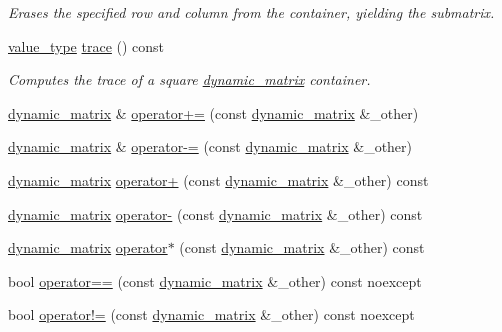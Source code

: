 \begin{DoxyCompactItemize}
$$\begin{DoxyCompactList}\small\item\em Erases the specified row and column from the container, yielding the submatrix. \end{DoxyCompactList}\item 
\hyperlink{classcrsc_1_1dynamic__matrix_a27b83d28002e3e2bb316f1f0460e9cca}{value\+\_\+type} \hyperlink{classcrsc_1_1dynamic__matrix_a78f379e2ac0864c82bca8c6d3153562f}{trace} () const 
\begin{DoxyCompactList}\small\item\em Computes the trace of a square {\ttfamily \hyperlink{classcrsc_1_1dynamic__matrix}{dynamic\+\_\+matrix}} container. \end{DoxyCompactList}\item 
\hyperlink{classcrsc_1_1dynamic__matrix}{dynamic\+\_\+matrix} \& \hyperlink{classcrsc_1_1dynamic__matrix_ad90a1ed68f4925e6362470e7231068ef}{operator+=} (const \hyperlink{classcrsc_1_1dynamic__matrix}{dynamic\+\_\+matrix} \&\+\_\+other)
\item 
\hyperlink{classcrsc_1_1dynamic__matrix}{dynamic\+\_\+matrix} \& \hyperlink{classcrsc_1_1dynamic__matrix_a06ec76adfbaef9ca4ab5a4e2eb65cd42}{operator-\/=} (const \hyperlink{classcrsc_1_1dynamic__matrix}{dynamic\+\_\+matrix} \&\+\_\+other)
\item 
\hyperlink{classcrsc_1_1dynamic__matrix}{dynamic\+\_\+matrix} \hyperlink{classcrsc_1_1dynamic__matrix_a12d99095acf979b8565a0b2471733930}{operator+} (const \hyperlink{classcrsc_1_1dynamic__matrix}{dynamic\+\_\+matrix} \&\+\_\+other) const 
\item 
\hyperlink{classcrsc_1_1dynamic__matrix}{dynamic\+\_\+matrix} \hyperlink{classcrsc_1_1dynamic__matrix_a7e4ff16e82dd3bf8ce1815046f78af9b}{operator-\/} (const \hyperlink{classcrsc_1_1dynamic__matrix}{dynamic\+\_\+matrix} \&\+\_\+other) const 
\item 
\hyperlink{classcrsc_1_1dynamic__matrix}{dynamic\+\_\+matrix} \hyperlink{classcrsc_1_1dynamic__matrix_a52f094280470a2c6b7682b1e3dbd44d7}{operator$\ast$} (const \hyperlink{classcrsc_1_1dynamic__matrix}{dynamic\+\_\+matrix} \&\+\_\+other) const 
\item 
bool \hyperlink{classcrsc_1_1dynamic__matrix_ac7a90a3918e7f4cdb65cd0d8dca4dcdb}{operator==} (const \hyperlink{classcrsc_1_1dynamic__matrix}{dynamic\+\_\+matrix} \&\+\_\+other) const  noexcept
\item 
bool \hyperlink{classcrsc_1_1dynamic__matrix_a3b7cbfea70074ad738f8dc0dca54c33b}{operator!=} (const \hyperlink{classcrsc_1_1dynamic__matrix}{dynamic\+\_\+matrix} \&\+\_\+other) const  noexcept
\end{DoxyCompactItemize}
